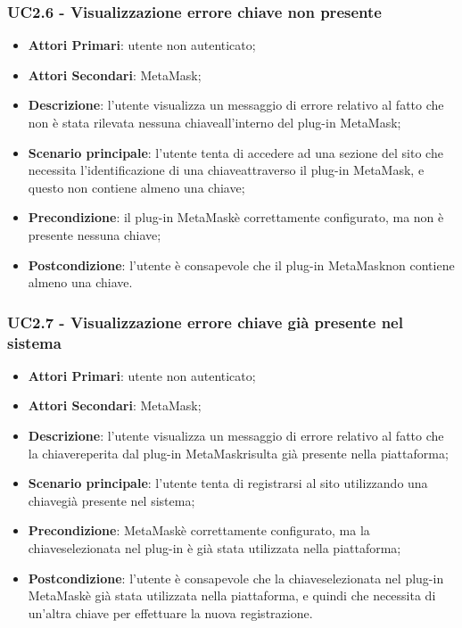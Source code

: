\subsubsection{UC2.6 - Visualizzazione errore chiave non 
	presente}
\begin{itemize}
	\item \textbf{Attori Primari}: utente non autenticato;
	\item \textbf{Attori Secondari}: MetaMask\glo;
	\item \textbf{Descrizione}:
	l'utente visualizza un messaggio di errore relativo al fatto che non è stata rilevata nessuna chiave\glosp all'interno del plug-in MetaMask\glo;
	\item \textbf{Scenario principale}: l'utente tenta di accedere ad una sezione del sito che necessita l'identificazione di una chiave\glosp attraverso il plug-in MetaMask\glo, e questo non contiene almeno una chiave\glo;
	\item \textbf{Precondizione}: il plug-in MetaMask\glosp è correttamente configurato, ma non è presente nessuna chiave\glo;
	\item \textbf{Postcondizione}:
	l'utente è consapevole che il plug-in MetaMask\glosp non contiene almeno una chiave\glo.
	
\end{itemize}




\subsubsection{UC2.7 - Visualizzazione errore chiave già presente nel sistema}
\begin{itemize}
	\item \textbf{Attori Primari}: utente non autenticato;
	\item \textbf{Attori Secondari}: MetaMask\glo;
	\item \textbf{Descrizione}:
	l'utente visualizza un messaggio di errore relativo al fatto che la chiave\glosp reperita dal plug-in MetaMask\glosp risulta già presente nella piattaforma;
	\item \textbf{Scenario principale}: l'utente tenta di registrarsi al sito utilizzando una chiave\glosp già presente nel sistema;
	\item \textbf{Precondizione}: MetaMask\glosp è correttamente configurato, ma la chiave\glosp selezionata nel plug-in è già stata utilizzata nella piattaforma;
	\item \textbf{Postcondizione}:
	l'utente è consapevole che la chiave\glosp selezionata nel plug-in MetaMask\glosp è già stata utilizzata nella piattaforma, e quindi che necessita di un'altra chiave per effettuare la nuova registrazione.
\end{itemize}

